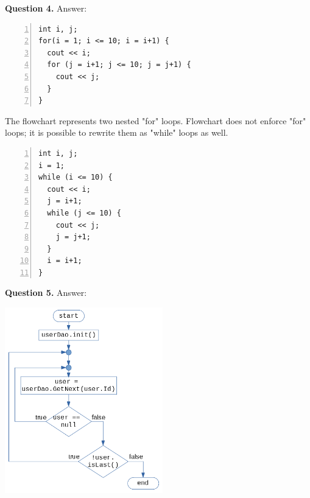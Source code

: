 \documentclass[11pt]{article}
\begin{document}
\vspace{20pt}
{\bf Question 4.} Answer:

{\footnotesize
\begin{center}
\begin{minipage}{.85\columnwidth}
\begin{Verbatim}[frame=single,numbers=left]
int i, j;
for(i = 1; i <= 10; i = i+1) {
  cout << i; 
  for (j = i+1; j <= 10; j = j+1) {
    cout << j;
  }
}
\end{Verbatim}
\end{minipage}
\end{center}
}

The flowchart represents two nested "for" loops. 
Flowchart does not enforce "for" loops; it is possible 
to rewrite them as "while" loops as well.

{\footnotesize
\begin{center}
\begin{minipage}{.85\columnwidth}
\begin{Verbatim}[frame=single,numbers=left]
int i, j;
i = 1; 
while (i <= 10) {
  cout << i; 
  j = i+1;
  while (j <= 10) {
    cout << j;
    j = j+1;
  }
  i = i+1;
}
\end{Verbatim}
\end{minipage}
\end{center}
}


\vspace{20pt}
{\bf Question 5.} Answer:


\begin{center}
\includegraphics[width=2.7in]{assignment01-expr-control/assignment01-prob5-flowchart.png}
\end{center}
\end{document}
